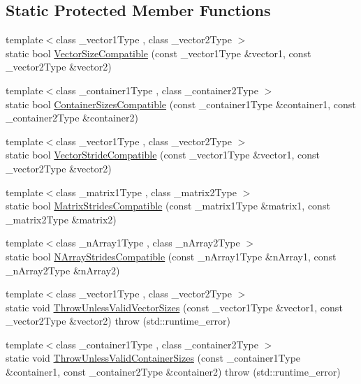 \subsection*{Static Protected Member Functions}
{\bf }\par
\begin{DoxyCompactItemize}
\item 
{\footnotesize template$<$class \+\_\+vector1\+Type , class \+\_\+vector2\+Type $>$ }\\static bool \hyperlink{classvct_fast_copy_ab2c9114578e85d404e254ad58f761ed4}{Vector\+Size\+Compatible} (const \+\_\+vector1\+Type \&vector1, const \+\_\+vector2\+Type \&vector2)
\item 
{\footnotesize template$<$class \+\_\+container1\+Type , class \+\_\+container2\+Type $>$ }\\static bool \hyperlink{classvct_fast_copy_a7c5a056603df9a993d4bde635cb61a62}{Container\+Sizes\+Compatible} (const \+\_\+container1\+Type \&container1, const \+\_\+container2\+Type \&container2)
\item 
{\footnotesize template$<$class \+\_\+vector1\+Type , class \+\_\+vector2\+Type $>$ }\\static bool \hyperlink{classvct_fast_copy_aa64fac5d83c9184800bb4df1cf30b052}{Vector\+Stride\+Compatible} (const \+\_\+vector1\+Type \&vector1, const \+\_\+vector2\+Type \&vector2)
\item 
{\footnotesize template$<$class \+\_\+matrix1\+Type , class \+\_\+matrix2\+Type $>$ }\\static bool \hyperlink{classvct_fast_copy_af8b135cabbe52d3b16129dbbf224cf41}{Matrix\+Strides\+Compatible} (const \+\_\+matrix1\+Type \&matrix1, const \+\_\+matrix2\+Type \&matrix2)
\item 
{\footnotesize template$<$class \+\_\+n\+Array1\+Type , class \+\_\+n\+Array2\+Type $>$ }\\static bool \hyperlink{classvct_fast_copy_a9e3d20628a36e889a1a6224983d79e5b}{N\+Array\+Strides\+Compatible} (const \+\_\+n\+Array1\+Type \&n\+Array1, const \+\_\+n\+Array2\+Type \&n\+Array2)
\end{DoxyCompactItemize}

{\bf }\par
\begin{DoxyCompactItemize}
\item 
{\footnotesize template$<$class \+\_\+vector1\+Type , class \+\_\+vector2\+Type $>$ }\\static void \hyperlink{classvct_fast_copy_a55fd7b6ee74b14fa20f5ca29c4917806}{Throw\+Unless\+Valid\+Vector\+Sizes} (const \+\_\+vector1\+Type \&vector1, const \+\_\+vector2\+Type \&vector2)  throw (std\+::runtime\+\_\+error)
\item 
{\footnotesize template$<$class \+\_\+container1\+Type , class \+\_\+container2\+Type $>$ }\\static void \hyperlink{classvct_fast_copy_a20bd38c200a02319129f4514c9b74174}{Throw\+Unless\+Valid\+Container\+Sizes} (const \+\_\+container1\+Type \&container1, const \+\_\+container2\+Type \&container2)  throw (std\+::runtime\+\_\+error)
\end{DoxyCompactItemize}



